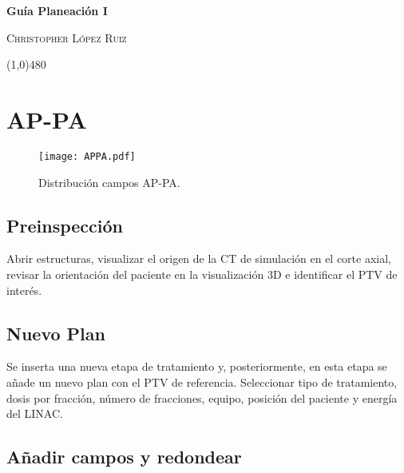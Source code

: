\documentclass{article}
\begin{document}
\centerline{\Large \textbf{\textcolor{Grayo}{Guía Planeación I}}}
\vspace{2mm}
\centerline{\large \textsc{Christopher López Ruiz}}

\vspace{-10pt}

\begin{center}
\line(1,0){480}
\end{center}



\vspace{3pt}
%

\section*{AP-PA}

\begin{figure}[h]
    \centering
    \texttt{[image: APPA.pdf]}
    \caption{Distribución campos AP-PA.}
    \label{APPA}
\end{figure}

\subsection*{Preinspección}

Abrir estructuras, visualizar el origen de la CT de simulación en el corte axial, revisar la orientación del paciente en la visualización 3D e identificar el PTV de interés.

\subsection*{Nuevo Plan}

Se inserta una nueva etapa de tratamiento y, posteriormente, en esta etapa se añade un nuevo plan con el PTV de referencia. Seleccionar tipo de tratamiento, dosis por fracción, número de fracciones, equipo, posición del paciente y energía del LINAC.

\subsection*{Añadir campos y redondear}
\end{document}
